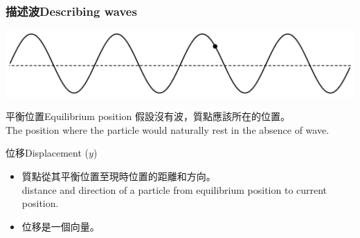 \documentclass[beamer=true]{standalone}
\begin{document}
\begin{frame}
    \frametitle{描述波Describing waves}
    \par{\par\centering\includegraphics[width=.75\textwidth]{./img/ch1_2024-05-06-20-43-46.png}\par}
    \begin{block}{平衡位置Equilibrium position}
        假設沒有波，質點應該所在的位置。\\The position where the particle would naturally rest in the absence of wave.
    \end{block}
    \begin{block}{位移Displacement ($y$)}
        \begin{itemize}
            \item 質點從其平衡位置至現時位置的距離和方向。\\distance and direction of a particle from equilibrium position to current position.
            \item 位移是一個向量。
        \end{itemize}
    \end{block}
\end{frame}
\end{document}
